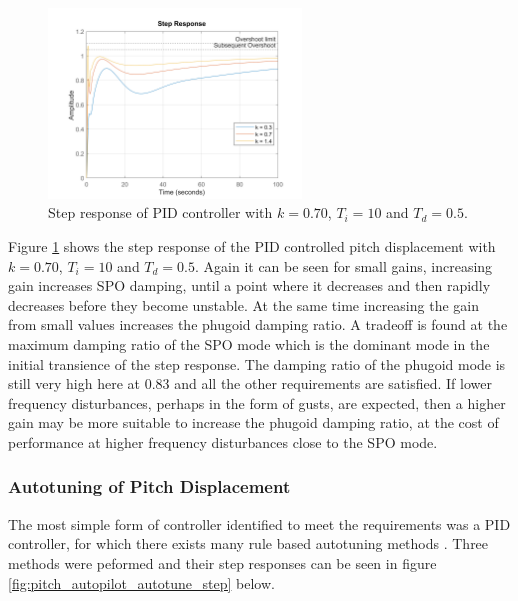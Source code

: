 \documentclass{article}
\begin{document}
\begin{figure}[H]
    \centering
    \includegraphics[width=0.6\textwidth]{figures/pitch_autopilot_compensated_step.png}
    \caption{Step response of PID controller with $k=0.70$, $T_i = 10$ and $T_d = 0.5$.}
    \label{fig:pitch_autopilot_compensated_step}
\end{figure}

Figure \ref{fig:pitch_autopilot_compensated_step} shows the step response of the PID controlled pitch displacement with $k=0.70$, $T_i = 10$ and $T_d = 0.5$.
Again it can be seen for small gains, increasing gain increases SPO damping, until a point where it decreases and then rapidly decreases before they become unstable.
At the same time increasing the gain from small values increases the phugoid damping ratio.
A tradeoff is found at the maximum damping ratio of the SPO mode which is the dominant mode in the initial transience of the step response.
The damping ratio of the phugoid mode is still very high here at 0.83 and all the other requirements are satisfied.
If lower frequency disturbances, perhaps in the form of gusts, are expected, then a higher gain may be more suitable to increase the phugoid damping ratio,
at the cost of performance at higher frequency disturbances close to the SPO mode.

\subsubsection{Autotuning of Pitch Displacement}

The most simple form of controller identified to meet the requirements was a PID controller, for which
there exists many rule based autotuning methods \cite{autotune}.
Three methods were peformed and their step responses can be seen in figure \ref{fig:pitch_autopilot_autotune_step} below.
\end{document}
